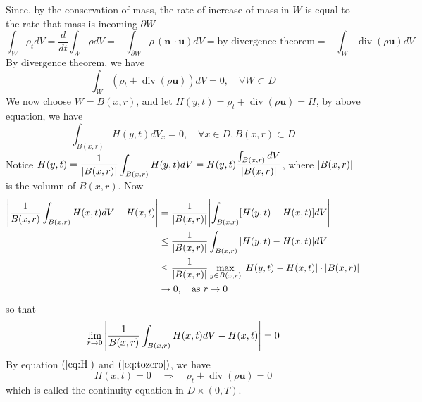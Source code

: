 Since, by the conservation of mass, the rate of increase of mass in $W$ is equal to the rate that mass is incoming $\partial W$
\begin{equation}
\int_{W} \rho_t  dV
= \frac{d}{dt} \int_{W} \rho  dV
= - \int_{\partial W} \rho \,(\textbf{n}\, \cdot \textbf{u}) dV
= \text{by divergence theorem}
= - \int_{W} \operatorname{div}(\rho\textbf{u})dV
\end{equation}
By divergence theorem, we have
\begin{equation}
\int_{W}\left(\rho_t + \operatorname{div}(\rho\textbf{u})\right) dV = 0,\quad\forall W\subset D
\end{equation}
We now choose $W=B(x,r)$, and let $H(y,t) =\rho_t + \operatorname{div}(\rho\textbf{u})=H$, by above equation, we have
\begin{equation}
\int_{B(x,r)} H(y,t) dV_x = 0,\quad \forall x\in D, B(x,r)\subset D\label{eq:H}
\end{equation}
Notice $\displaystyle H(y,t) = \frac{1}{\abs{B(x,r)}}\int_{B(x,r)} H(y,t) dV = H(y,t)\frac{\int_{B(x,r)}dV}{\abs{B(x,r)}}$, where $\abs{B(x,r)}$ is the volumn of $B(x,r)$. Now 
\begin{equation}
\begin{aligned}
\abs{\frac{1}{B(x,r)} \int_{B(x,r)} H(x,t)dV - H(x,t)}
&= \frac{1}{\abs{B(x,r)}} \abs{\int_{B(x,r)} [H(y,t) - H(x,t)]dV } \\
&\leq \frac{1}{\abs{B(x,r)}} \int_{B(x,r)} \abs{H(y,t) - H(x,t)}dV  \\
&\leq \frac{1}{\abs{B(x,r)}} \max_{y\in B(x,r)} \abs{H(y,t) - H(x,t)} \cdot \abs{B(x,r)} \\
&\to 0,\quad\text{as } r \to 0
\end{aligned}
\end{equation}
so that 
\begin{equation}
\lim_{r\to 0}\abs{\frac{1}{B(x,r)} \int_{B(x,r)} H(x,t)dV - H(x,t)} = 0\label{eq:tozero}
\end{equation}
By equation $(\ref{eq:H})$ and $(\ref{eq:tozero})$, we have
\begin{equation}
H(x,t)=0\quad\Rightarrow\quad \rho_t + \operatorname{div}(\rho\textbf{u}) = 0
\end{equation}
which is called the continuity equation in $D\times (0,T)$.






